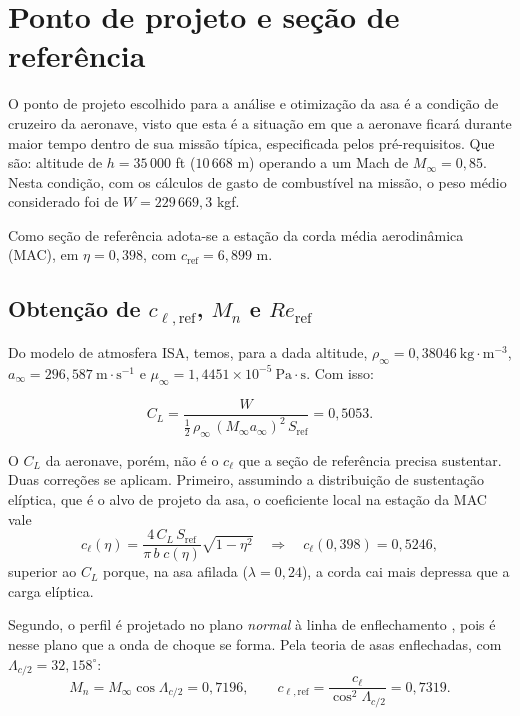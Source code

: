\newpage
\section{Ponto de projeto e seção de referência}

O ponto de projeto escolhido para a análise e otimização da asa é a condição
de cruzeiro da aeronave, visto que esta é a situação em que a aeronave ficará
durante maior tempo dentro de sua missão típica, especificada pelos
pré-requisitos. Que são: altitude de $h = 35\,000$ ft ($10\,668$ m) operando a
um Mach de $M_\infty = 0{,}85$. Nesta condição, com os cálculos de gasto de
combustível na missão, o peso médio considerado foi de $W = 229\,669{,}3$ kgf.

Como seção de referência adota-se a estação da corda média aerodinâmica
(MAC), em $\eta = 0{,}398$, com $c_{\mathrm{ref}} = 6{,}899$ m.

\subsection*{Obtenção de $c_{\ell,\mathrm{ref}}$, $M_n$ e $Re_{\mathrm{ref}}$}

Do modelo de atmosfera ISA, temos, para a dada altitude,
$\rho_\infty = 0{,}38046 \ \mathrm{kg \cdot m^{-3}}$,
$a_\infty = 296{,}587 \ \mathrm{m \cdot s^{-1}}$ e
$\mu_\infty = 1{,}4451 \times 10^{-5} \ \mathrm{Pa \cdot s}$. Com isso:

\begin{equation*}
    C_L = \frac{W}{\tfrac{1}{2}\,\rho_\infty\,(M_\infty a_\infty)^2\,S_{\mathrm{ref}}}
        = 0{,}5053.
\end{equation*}

O $C_L$ da aeronave, porém, não é o $c_\ell$ que a seção de referência
precisa sustentar. Duas correções se aplicam. Primeiro, assumindo a
distribuição de sustentação elíptica, que é o alvo de projeto da asa, o
coeficiente local na estação da MAC vale
\begin{equation*}
    c_\ell(\eta) = \frac{4\,C_L\,S_{\mathrm{ref}}}{\pi\,b\;c(\eta)}\sqrt{1-\eta^2}
    \quad\Rightarrow\quad c_\ell(0{,}398) = 0{,}5246,
\end{equation*}
superior ao $C_L$ porque, na asa afilada ($\lambda = 0{,}24$), a corda cai
mais depressa que a carga elíptica.

Segundo, o perfil é projetado no plano \emph{normal} à linha de enflechamento
, pois é nesse plano que a onda de choque se forma. Pela teoria de asas
enflechadas, com $\Lambda_{c/2} = 32{,}158^\circ$:
\begin{equation*}
    M_n = M_\infty \cos\Lambda_{c/2} = 0{,}7196,
    \qquad
    c_{\ell,\mathrm{ref}} = \frac{c_\ell}{\cos^2\Lambda_{c/2}} = 0{,}7319.
\end{equation*}

